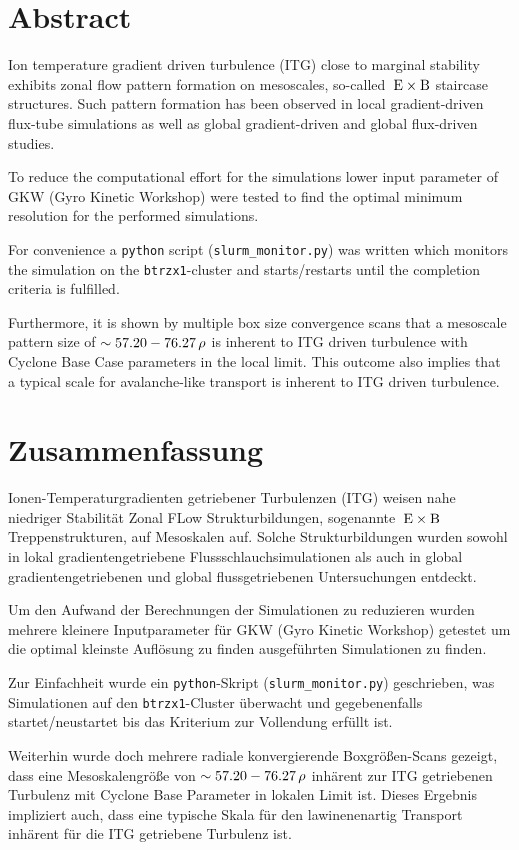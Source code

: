 \chapter*{Abstract}
\label{chap:abstractENG}

Ion temperature gradient driven turbulence (ITG) close to marginal stability exhibits zonal flow pattern formation on mesoscales, so-called $\mathrm{\:E}\times\mathrm{B}$ staircase structures. Such pattern formation has been observed in local gradient-driven flux-tube simulations as well as global gradient-driven and global flux-driven studies.

To reduce the computational effort for the simulations lower input parameter of GKW (Gyro Kinetic Workshop) were tested to find the optimal minimum resolution for the performed simulations.

For convenience a \texttt{python} script (\texttt{slurm\_monitor.py}) was written which monitors the simulation on the \texttt{btrzx1}-cluster and starts/restarts until the completion criteria is fulfilled.

Furthermore, it is shown by multiple box size convergence scans that a mesoscale pattern  size of $\sim 57.20-76.27\,\rho$ is inherent to ITG driven turbulence with Cyclone Base Case parameters in the local limit. This outcome also implies that a typical scale for avalanche-like transport is inherent to ITG driven turbulence.

\chapter*{Zusammenfassung}
\label{chap:abstractDE}

Ionen-Temperaturgradienten getriebener Turbulenzen (ITG) weisen nahe niedriger Stabilität Zonal FLow Strukturbildungen, sogenannte $\mathrm{\:E}\times\mathrm{B}$ Treppenstrukturen, auf Mesoskalen auf. Solche Strukturbildungen wurden sowohl in lokal gradientengetriebene Flussschlauchsimulationen als auch in global gradientengetriebenen und global flussgetriebenen Untersuchungen entdeckt. 

Um den Aufwand der Berechnungen der Simulationen zu reduzieren wurden mehrere kleinere Inputparameter für GKW (Gyro Kinetic Workshop) getestet um die optimal kleinste Auflösung zu finden ausgeführten Simulationen zu finden.

Zur Einfachheit wurde ein \texttt{python}-Skript (\texttt{slurm\_monitor.py}) geschrieben, was Simulationen auf den \texttt{btrzx1}-Cluster überwacht und gegebenenfalls startet/neustartet bis das Kriterium zur Vollendung erfüllt ist.

Weiterhin wurde doch mehrere radiale konvergierende Boxgrößen-Scans gezeigt, dass eine Mesoskalengröße von $\sim 57.20-76.27\,\rho$ inhärent zur ITG getriebenen Turbulenz mit Cyclone Base Parameter in lokalen Limit ist. Dieses Ergebnis impliziert auch, dass eine typische Skala für den lawinenenartig Transport inhärent für die ITG getriebene Turbulenz ist.